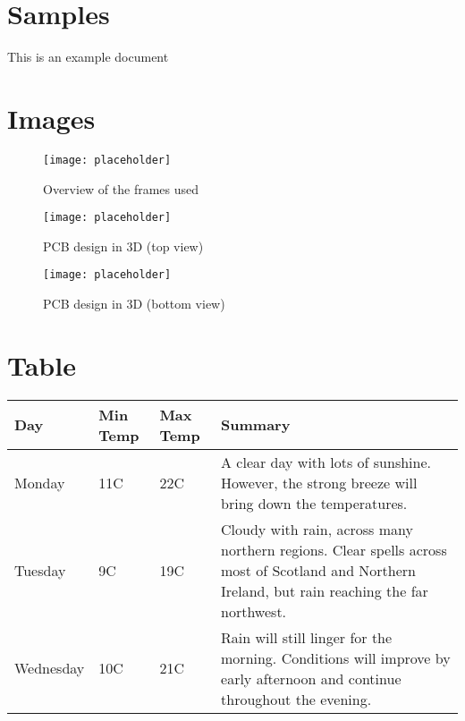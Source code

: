\section{Samples}
This is an example document
\lipsum[1-3]

\clearpage
\section{Images}
\begin{figure}[H]
	\centering
	\texttt{[image: placeholder]}
	\caption{Overview of the frames used}
	\label{fig:placeholder}
\end{figure}

\begin{multicols}{2}
	\begin{figure}[H]
		\centering
		\texttt{[image: placeholder]}
		\caption{PCB design in 3D (top view)}
		\label{fig:multicol:placeholder1}
	\end{figure}

	\begin{figure}[H]
		\centering
		\texttt{[image: placeholder]}
		\caption{PCB design in 3D (bottom view)}
		\label{fig:multicol:placeholder2}
	\end{figure}
\end{multicols}


\section{Table}
\begin{center}
	\begin{tabular}{ | l | l | l | p{5cm} |}
		\hline
		Day & Min Temp & Max Temp & Summary \\ \hline
		Monday & 11C & 22C & A clear day with lots of sunshine.  
		However, the strong breeze will bring down the temperatures. \\ \hline
		Tuesday & 9C & 19C & Cloudy with rain, across many northern regions. Clear spells 
		across most of Scotland and Northern Ireland, 
		but rain reaching the far northwest. \\ \hline
		Wednesday & 10C & 21C & Rain will still linger for the morning. 
		Conditions will improve by early afternoon and continue 
		throughout the evening. \\
		\hline
	\end{tabular}
\end{center}

